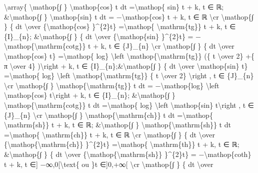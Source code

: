 \documentclass[]{article}
\begin{document}
\textbackslash{}array\{ \textbackslash{}mathop\{∫ \}
\textbackslash{}mathop\{cos\} t dt =\textbackslash{}mathop\{ sin\} t +
k, t ∈ ℝ; \&\textbackslash{}mathop\{∫ \} \textbackslash{}mathop\{sin\} t
dt = −\textbackslash{}mathop\{cos\} t + k, t ∈ ℝ \textbackslash{}cr
\textbackslash{}mathop\{∫ \} \{ dt \textbackslash{}over
\{\textbackslash{}mathop\{cos\} \}\^{}\{2\}t\} =\textbackslash{}mathop\{
\textbackslash{}mathrm\{tg\}\} t + k, t ∈ \{I\}\_\{n\};
\&\textbackslash{}mathop\{∫ \} \{ dt \textbackslash{}over
\{\textbackslash{}mathop\{sin\} \}\^{}\{2\}t\} =
−\textbackslash{}mathop\{\textbackslash{}mathrm\{cotg\}\} t + k, t ∈
\{J\}\_\{n\} \textbackslash{}cr \textbackslash{}mathop\{∫ \} \{ dt
\textbackslash{}over \textbackslash{}mathop\{cos\} t\}
=\textbackslash{}mathop\{ log\} \textbackslash{}left
\textbar{}\textbackslash{}mathop\{\textbackslash{}mathrm\{tg\}\} (\{ t
\textbackslash{}over 2\} +\{ π \textbackslash{}over 4\}
)\textbackslash{}right \textbar{} + k, t ∈
\{I\}\_\{n\};\&\textbackslash{}mathop\{∫ \} \{ dt \textbackslash{}over
\textbackslash{}mathop\{sin\} t\} =\textbackslash{}mathop\{ log\}
\textbackslash{}left
\textbar{}\textbackslash{}mathop\{\textbackslash{}mathrm\{tg\}\} \{ t
\textbackslash{}over 2\} \textbackslash{}right \textbar{}, t ∈
\{J\}\_\{n\} \textbackslash{}cr \textbackslash{}mathop\{∫ \}
\textbackslash{}mathop\{\textbackslash{}mathrm\{tg\}\} t dt =
−\textbackslash{}mathop\{log\} \textbackslash{}left
\textbar{}\textbackslash{}mathop\{cos\} t\textbackslash{}right
\textbar{} + k, t ∈ \{I\}\_\{n\}; \&\textbackslash{}mathop\{∫ \}
\textbackslash{}mathop\{\textbackslash{}mathrm\{cotg\}\} t dt
=\textbackslash{}mathop\{ log\} \textbackslash{}left
\textbar{}\textbackslash{}mathop\{sin\} t\textbackslash{}right
\textbar{}, t ∈ \{J\}\_\{n\} \textbackslash{}cr
\textbackslash{}mathop\{∫ \}
\textbackslash{}mathop\{\textbackslash{}mathrm\{ch\}\} t dt
=\textbackslash{}mathop\{ \textbackslash{}mathrm\{sh\}\} t + k, t ∈ ℝ;
\&\textbackslash{}mathop\{∫ \}
\textbackslash{}mathop\{\textbackslash{}mathrm\{sh\}\} t dt
=\textbackslash{}mathop\{ \textbackslash{}mathrm\{ch\}\} t + k, t ∈ ℝ
\textbackslash{}cr \textbackslash{}mathop\{∫ \} \{ dt
\textbackslash{}over
\{\textbackslash{}mathop\{\textbackslash{}mathrm\{ch\}\} \}\^{}\{2\}t\}
=\textbackslash{}mathop\{ \textbackslash{}mathrm\{th\}\} t + k, t ∈ ℝ;
\&\textbackslash{}mathop\{∫ \} \{ dt \textbackslash{}over
\{\textbackslash{}mathop\{\textbackslash{}mathrm\{sh\}\} \}\^{}\{2\}t\}
= −\textbackslash{}mathop\{coth\} t + k, t ∈{]}
−∞,0{[}\textbackslash{}text\{ ou \}t ∈{]}0,+∞{[} \textbackslash{}cr
\textbackslash{}mathop\{∫ \} \{ dt \textbackslash{}over
\end{document}
